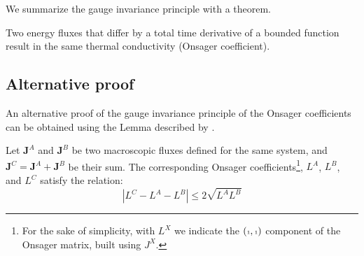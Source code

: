 We summarize the gauge invariance principle with a theorem.
\begin{theorem} \label{th:gauge-invariance}
Two energy fluxes that differ by a total time derivative of a bounded function result in the same thermal conductivity (Onsager coefficient).
\end{theorem}


\subsection{Alternative proof}
An alternative proof of the gauge invariance principle of the Onsager coefficients can be obtained using the Lemma described by \citet{Marcolongo2016}.

\begin{lemma} \label{th:aris-theorem}
Let $\mathbf{J}^A$ and $\mathbf{J}^B$ be two macroscopic fluxes defined for the same system, and  $\mathbf{J}^{C} = \mathbf{J}^A + \mathbf{J}^B$ be their sum. The corresponding Onsager coefficients\footnote{For the sake of simplicity, with $L^X$ we indicate the $({\scriptscriptstyle 1},{\scriptscriptstyle 1})$ component of the Onsager matrix, built using $J^X$.
}, $L^{A}$, $L^{B}$, and $L^{C}$ satisfy the relation:
\begin{equation} \label{eq:aris-theorem}
    \left| L^{C} - L^{A} - L^{B} \right| \leq 2 \sqrt{L^{A} L^{B}}
\end{equation}
\end{lemma}

